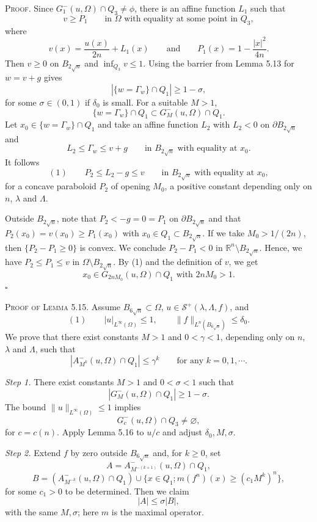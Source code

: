 \textsc{Proof.} \sketch Since $G_1^-(u,\Omega)\cap Q_3
\neq \phi$, there is an affine function $L_1$ such that
\[
v\geq P_1 \qquad \text{in } \Omega \text{ with equality at some point in } Q_3,
\]
where
\[
v(x)=\frac{u(x)}{2n}+L_1(x) \qquad \text{and} \qquad P_1(x)=1-\frac{|x|^2}{4n}.
\]
Then $v\ge0$ on $B_{2\sqrt n}$ and $\inf_{Q_3}v\le1$. Using the barrier from Lemma 5.13 for $w=v+g$ gives
\[
|\{w=\Gamma_w\}\cap Q_1|\geq 1-\sigma,
\]
for some $\sigma\in(0,1)$ if $\delta_0$ is small. For a suitable $M>1$,
\[
\{w=\Gamma_w\}\cap Q_1\subset G_M^-(u,\Omega)\cap Q_1.
\]
Let $x_0\in \{w=\Gamma_w\}\cap Q_1$ and take an affine function $L_2$ with $L_2<0$ on $\partial B_{2\sqrt{n}}$ and
\[
L_2\leq \Gamma_w\leq v+g \qquad \text{in } B_{2\sqrt{n}} \text{ with equality at } x_0.
\]
It follows
\[
(1)\qquad P_2\leq L_2-g\leq v \qquad \text{in } B_{2\sqrt{n}} \text{ with equality at } x_0,
\]
for a concave paraboloid $P_2$ of opening $M_0$, a positive constant depending only on
$n$, $\lambda$ and $\Lambda$.

Outside $B_{2\sqrt n}$, note that $P_2<-g=0=P_1$ on
$\partial B_{2\sqrt{n}}$ and that $P_2(x_0)=v(x_0)\geq P_1(x_0)$ with $x_0\in Q_1\subset B_{2\sqrt{n}}$. If we take
$M_0>1/(2n)$, then $\{P_2-P_1\geq 0\}$ is convex. We conclude $P_2-P_1<0$ in $\mathbb{R}^n\setminus B_{2\sqrt{n}}$.
Hence, we have $P_2\leq P_1\leq v$ in $\Omega\setminus B_{2\sqrt{n}}$. By (1) and the definition of $v$, we get
\[
x_0\in G_{2nM_0}(u,\Omega)\cap Q_1 \text{ with } 2nM_0>1.
\]
\hfill$\square$

\textsc{Proof of Lemma 5.15.} \sketch Assume $B_{6\sqrt n}\subset\Omega$, $u\in\mathcal S^+(\lambda,\Lambda,f)$, and
\[
(1)\qquad |u|_{L^\infty(\Omega)}\leq 1,\qquad \|f\|_{L^n(B_{6\sqrt{n}})}\leq \delta_0.
\]
We prove that there exist constants $M>1$ and $0<\gamma<1$, depending only on $n$, $\lambda$
and $\Lambda$, such that
\[
|A_{M^k}^-(u,\Omega)\cap Q_1|\leq \gamma^k \qquad \text{for any } k=0,1,\cdots .
\]


\noindent\textit{Step 1.} There exist constants $M>1$ and $0<\sigma<1$ such that
\begin{equation}
\tag{2}
\left|G_M^-(u,\Omega)\cap Q_1\right|\ge 1-\sigma.
\end{equation}
The bound $\|u\|_{L^\infty(\Omega)}\le1$ implies
\[
G_c^-(u,\Omega)\cap Q_3
\neq \varnothing,
\]
for $c=c(n)$. Apply Lemma 5.16 to $u/c$ and adjust $\delta_0,M,\sigma$.


\noindent\textit{Step 2.} Extend $f$ by zero outside $B_{6\sqrt n}$ and, for $k\ge0$, set
\[
A=A_{M^{-(k+1)}}^-(u,\Omega)\cap Q_1,
\]
\[
B=\left(A_{M^{-k}}^-(u,\Omega)\cap Q_1\right)\cup\{x\in Q_1;m(f^n)(x)\ge (c_1M^k)^n\},
\]
for some $c_1>0$ to be determined. Then we claim
\[
|A|\le \sigma|B|,
\]
with the same $M,\sigma$; here $m$ is the maximal operator.

